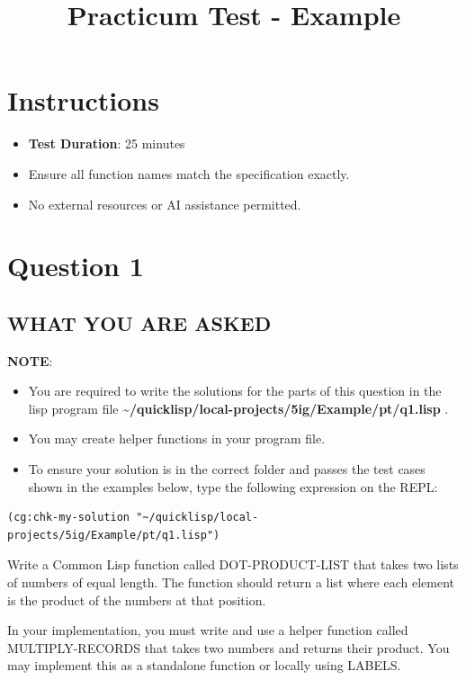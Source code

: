 \documentclass[11pt]{article}
\date{}
\title{Practicum Test - Example}
\begin{document}
\maketitle

\section*{Instructions}
\label{sec:orgc73f5a4}


\begin{itemize}
\item \textbf{Test Duration}: 25 minutes
\item Ensure all function names match the specification exactly.
\item No external resources or AI assistance permitted.
\end{itemize}
\section*{Question 1}
\label{sec:orgb5fa7cb}

\subsection*{WHAT YOU ARE ASKED}
\label{sec:orge7c3c2c}


\textbf{NOTE}:
\begin{itemize}
\item You are required to write the solutions for the parts of this question in the lisp program file \textbf{\textasciitilde{}/quicklisp/local-projects/5ig/Example/pt/q1.lisp} .
\item You may create helper functions in your program file.
\item To ensure your solution is in the correct folder and passes the test cases shown in the examples below,  type the following expression on the REPL:
\end{itemize}

\begin{verbatim}
(cg:chk-my-solution "~/quicklisp/local-projects/5ig/Example/pt/q1.lisp")
\end{verbatim}

Write a Common Lisp function called DOT-PRODUCT-LIST that takes two lists of numbers of equal length. The function should return a list where each element is the product of the numbers at that position. 

In your implementation, you must write and use a helper function called MULTIPLY-RECORDS that takes two numbers and returns their product. You may implement this as a standalone function or locally using LABELS.
\end{document}
